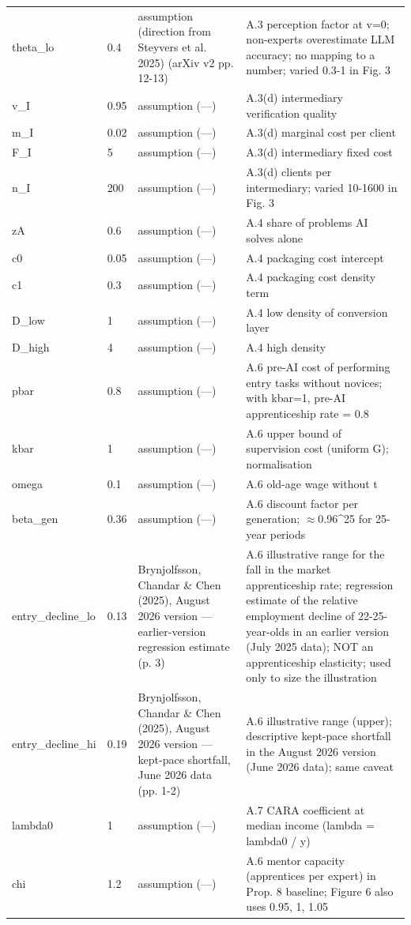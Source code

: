 \begin{longtable}{p{}p{}p{}p{}}
theta\_lo & 0.4 & assumption (direction from Steyvers et al. 2025) (arXiv v2 pp. 12-13) & A.3 perception factor at v=0; non-experts overestimate LLM accuracy; no mapping to a number; varied 0.3-1 in Fig. 3\\
v\_I & 0.95 & assumption (—) & A.3(d) intermediary verification quality\\
m\_I & 0.02 & assumption (—) & A.3(d) marginal cost per client\\
F\_I & 5 & assumption (—) & A.3(d) intermediary fixed cost\\
n\_I & 200 & assumption (—) & A.3(d) clients per intermediary; varied 10-1600 in Fig. 3\\
zA & 0.6 & assumption (—) & A.4 share of problems AI solves alone\\
c0 & 0.05 & assumption (—) & A.4 packaging cost intercept\\
c1 & 0.3 & assumption (—) & A.4 packaging cost density term\\
D\_low & 1 & assumption (—) & A.4 low density of conversion layer\\
D\_high & 4 & assumption (—) & A.4 high density\\
pbar & 0.8 & assumption (—) & A.6 pre-AI cost of performing entry tasks without novices; with kbar=1, pre-AI apprenticeship rate = 0.8\\
kbar & 1 & assumption (—) & A.6 upper bound of supervision cost (uniform G); normalisation\\
omega & 0.1 & assumption (—) & A.6 old-age wage without t\\
beta\_gen & 0.36 & assumption (—) & A.6 discount factor per generation; $\approx$0.96\^{}25 for 25-year periods\\
entry\_decline\_lo & 0.13 & Brynjolfsson, Chandar \& Chen (2025), August 2026 version — earlier-version regression estimate (p. 3) & A.6 illustrative range for the fall in the market apprenticeship rate; regression estimate of the relative employment decline of 22-25-year-olds in an earlier version (July 2025 data); NOT an apprenticeship elasticity; used only to size the illustration\\
entry\_decline\_hi & 0.19 & Brynjolfsson, Chandar \& Chen (2025), August 2026 version — kept-pace shortfall, June 2026 data (pp. 1-2) & A.6 illustrative range (upper); descriptive kept-pace shortfall in the August 2026 version (June 2026 data); same caveat\\
lambda0 & 1 & assumption (—) & A.7 CARA coefficient at median income (lambda = lambda0 / y)\\
chi & 1.2 & assumption (—) & A.6 mentor capacity (apprentices per expert) in Prop. 8 baseline; Figure 6 also uses 0.95, 1, 1.05\\
\bottomrule\end{longtable}
